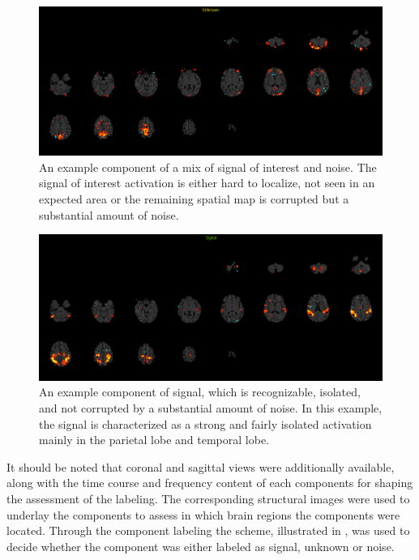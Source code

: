 \begin{figure}[H]                 
	\includegraphics[width=.85\textwidth]{figures/bMethods/unknown}  
	\caption{An example component of a mix of signal of interest and noise. The signal of interest activation is either hard to localize, not seen in an expected area or the remaining spatial map is corrupted but a substantial amount of noise.}
	\label{fig:meth:unknown} 
\end{figure}

\begin{figure}[H]                 
	\includegraphics[width=.85\textwidth]{figures/bMethods/signal}  
	\caption{An example component of signal, which is recognizable, isolated, and not corrupted by a substantial amount of noise. In this example, the signal is characterized as a strong and fairly isolated activation mainly in the parietal lobe and temporal lobe.}
	\label{fig:meth:signal} 
\end{figure}




It should be noted that coronal and sagittal views were additionally available, along with the time course and frequency content of each components for shaping the assessment of the labeling. The corresponding structural images were used to underlay the components to assess in which brain regions the components were located. Through the component labeling the scheme, illustrated in , was used to decide whether the component was either labeled as signal, unknown or noise. 
 
